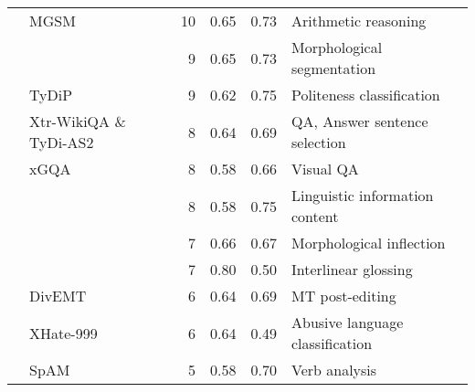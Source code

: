 \begin{tabular}{llrlll}
	\citet{shi2023language}                       & MGSM                   & 10                              & 0.65                          & 0.73                          & Arithmetic reasoning                \\
	\citet{mott-etal-2020-morphological}          &                        & 9                               & 0.65                          & 0.73                          & Morphological segmentation          \\
	\citet{srinivasan-choi-2022-tydip}            & TyDiP                  & 9                               & 0.62                          & 0.75                          & Politeness classification           \\
	\citet{gupta-etal-2023-cross}                 & Xtr-WikiQA \& TyDi-AS2 & 8                               & 0.64                          & 0.69                          & QA, Answer sentence selection       \\
	\citet{pfeiffer-etal-2022-xgqa}               & xGQA                   & 8                               & \cellcolor{low-color!40}0.58  & 0.66                          & Visual QA                           \\
	\citet{sproat-etal-2014-database}             &                        & 8                               & 0.58                          & 0.75                          & Linguistic information content      \\
	\citet{samir-silfverberg-2023-understanding}  &                        & 7                               & 0.66                          & 0.67                          & Morphological inflection            \\
	\citet{ginn-etal-2023-findings}               &                        & 7                               & 0.80\lowcov                   & 0.50                          & Interlinear glossing                \\
	\citet{sarti-etal-2022-divemt}                & DivEMT                 & 6                               & 0.64                          & 0.69                          & MT post-editing                     \\
	\citet{glavas-etal-2020-xhate}                & XHate-999              & 6                               & 0.64                          & 0.49                          & Abusive language classification     \\
	\citet{majewska-etal-2020-manual}             & SpAM                   & 5                               & 0.58                          & 0.70                          & Verb analysis                       \\

\end{tabular}
